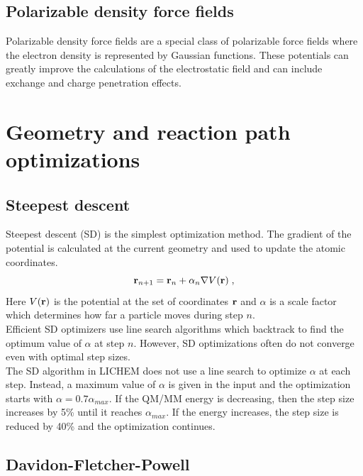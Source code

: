 \documentclass[12pt]{report}
\begin{document}
\subsection{Polarizable density force fields}

Polarizable density force fields are a special class of polarizable force
fields where the electron density is represented by Gaussian functions.
These potentials can greatly improve the calculations of the electrostatic
field and can include exchange and charge penetration effects.

\section{Geometry and reaction path optimizations}

\subsection{Steepest descent}

Steepest descent (SD) is the simplest optimization method.
The gradient of the potential is calculated at the current geometry and used
to update the atomic coordinates.
\begin{equation}
 {\textbf r}_{n+1} = {\textbf r}_n+\alpha_n \nabla V({\textbf r}) \; ,
\end{equation}
Here $V({\textbf r})$ is the potential at the set of coordinates
${\textbf r}$ and $\alpha$ is a scale factor which determines how far a
particle moves during step $n$. \\

Efficient SD optimizers use line search algorithms which backtrack to find the
optimum value of $\alpha$ at step $n$.
However, SD optimizations often do not converge even with optimal step
sizes. \\

The SD algorithm in LICHEM does not use a line search to optimize $\alpha$ at
each step.
Instead, a maximum value of $\alpha$ is given in the input and the
optimization starts with $\alpha=0.7\alpha_{max}$.
If the QM/MM energy is decreasing, then the step size increases by 5\% until it
reaches $\alpha_{max}$.
If the energy increases, the step size is reduced by 40\% and the optimization
continues.

\subsection{Davidon-Fletcher-Powell}
\end{document}
